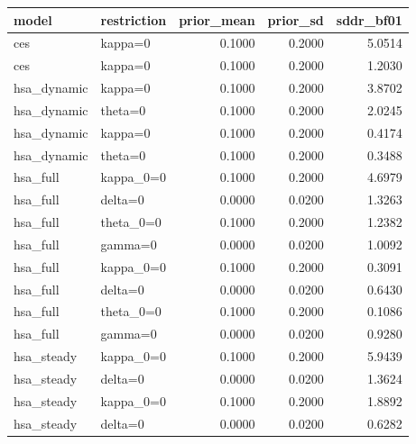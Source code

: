 \begin{tabular}{llrrr}
\toprule
model & restriction & prior\_mean & prior\_sd & sddr\_bf01 \\
\midrule
ces & kappa=0 & 0.1000 & 0.2000 & 5.0514 \\
ces & kappa=0 & 0.1000 & 0.2000 & 1.2030 \\
hsa\_dynamic & kappa=0 & 0.1000 & 0.2000 & 3.8702 \\
hsa\_dynamic & theta=0 & 0.1000 & 0.2000 & 2.0245 \\
hsa\_dynamic & kappa=0 & 0.1000 & 0.2000 & 0.4174 \\
hsa\_dynamic & theta=0 & 0.1000 & 0.2000 & 0.3488 \\
hsa\_full & kappa\_0=0 & 0.1000 & 0.2000 & 4.6979 \\
hsa\_full & delta=0 & 0.0000 & 0.0200 & 1.3263 \\
hsa\_full & theta\_0=0 & 0.1000 & 0.2000 & 1.2382 \\
hsa\_full & gamma=0 & 0.0000 & 0.0200 & 1.0092 \\
hsa\_full & kappa\_0=0 & 0.1000 & 0.2000 & 0.3091 \\
hsa\_full & delta=0 & 0.0000 & 0.0200 & 0.6430 \\
hsa\_full & theta\_0=0 & 0.1000 & 0.2000 & 0.1086 \\
hsa\_full & gamma=0 & 0.0000 & 0.0200 & 0.9280 \\
hsa\_steady & kappa\_0=0 & 0.1000 & 0.2000 & 5.9439 \\
hsa\_steady & delta=0 & 0.0000 & 0.0200 & 1.3624 \\
hsa\_steady & kappa\_0=0 & 0.1000 & 0.2000 & 1.8892 \\
hsa\_steady & delta=0 & 0.0000 & 0.0200 & 0.6282 \\
\bottomrule
\end{tabular}

